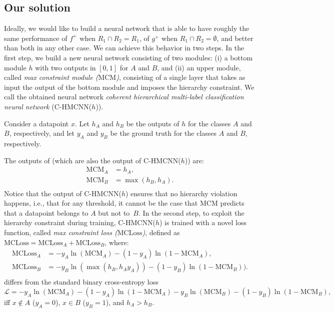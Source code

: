 \documentclass{article}
\newcommand{\lss}{\mathcal{L}}
\newcommand{\module}{\text{MCM}}
\newcommand{\loss}{\text{MCLoss}}
\newcommand{\system}[1]{C-HMCNN(#1)}
\begin{document}
\subsection{Our solution}\label{subsec:solution}

Ideally, we would like to build a neural network that is able to have roughly the same performance of $f^+$ when $R_1 \cap R_2 = R_1$, of $g^+$ when $R_1 \cap R_2 = \emptyset$, and better than both in any other case. We can achieve this behavior in two steps. In the first step, we build a new neural network consisting of two modules: (i) a bottom module $h$ with two outputs in $[0,1]$ for $A$ and $B$, and (ii) an upper module, called {\sl max constraint module ($\module$)},  consisting of a single layer that takes as input the output of the bottom module and imposes the hierarchy constraint. 
We call the obtained neural network {\sl coherent hierarchical multi-label classification neural network} (\system{$h$}). 

Consider a datapoint $x$. Let $h_A$ and $h_B$ be the outputs of $h$ for the classes $A$ and $B$, respectively, and let $y_A$ and $y_B$ be the ground truth for the classes $A$ and $B$, respectively. 

The outputs of {\module} (which are also the output of \system{$h$}) are: 
\begin{equation}
    \begin{aligned}
    \module_A & =  h_A, \\
    \module_B & = \max(h_B, h_A).\\
    \end{aligned}
\end{equation}
Notice that the output of \system{$h$} ensures that no hierarchy violation happens, i.e., that for any threshold, it cannot be the case that $\module$ predicts that a datapoint belongs to $A$ but  not to~$B$. 
In the second step, to exploit the hierarchy constraint during training, 
\system{$h$} is trained with a novel loss function, called {\sl max constraint loss ($\loss$)},
defined as $\loss = \loss_A + \loss_B$, where:
\begin{equation}
    \begin{aligned}
    \loss_A & = -y_A \ln(\module_A) - (1-y_A)\ln(1-\module_A), \\
\loss_B & = -y_B\ln(\max(h_B, h_Ay_A)) - (1-y_B)\ln(1-\module_B)). \\
\end{aligned}
\end{equation}
{\loss} differs from the standard binary cross-entropy loss
$$
\lss = - y_A \ln{(\module_A)} - (1- y_A) \ln{(1- \module_A)} - y_B \ln{(\module_B)} - (1- y_B) \ln{(1- \module_B)},
$$
iff $x\not\in A$ ($y_A = 0$), $x \in B$ ($y_B = 1$), and $h_A > h_B$. 
\end{document}
